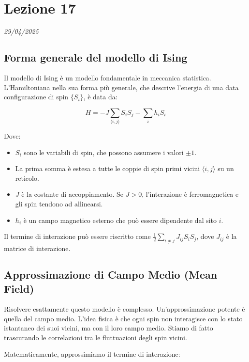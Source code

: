 \chapter{Lezione 17}
\label{capitolo_17}
\textit{29/04/2025}

\section{Forma generale del modello di Ising}
Il modello di Ising è un modello fondamentale in meccanica statistica. L'Hamiltoniana nella sua forma più generale, che descrive l'energia di una data configurazione di spin $\{S_i\}$, è data da:

\begin{equation} \label{eq:ch17_1}
H = -J \sum_{\langle i,j \rangle} S_i S_j - \sum_i h_i S_i
\end{equation}

Dove:
\begin{itemize}
    \item $S_i$ sono le variabili di spin, che possono assumere i valori $\pm 1$.
    \item La prima somma è estesa a tutte le coppie di spin primi vicini $\langle i,j \rangle$ su un reticolo.
    \item $J$ è la costante di accoppiamento. Se $J>0$, l'interazione è ferromagnetica e gli spin tendono ad allinearsi.
    \item $h_i$ è un campo magnetico esterno che può essere dipendente dal sito $i$.
\end{itemize}

Il termine di interazione può essere riscritto come $\frac{1}{2} \sum_{i \neq j} J_{ij} S_i S_j$, dove $J_{ij}$ è la matrice di interazione.

\section{Approssimazione di Campo Medio (Mean Field)}
Risolvere esattamente questo modello è complesso. Un'approssimazione potente è quella del campo medio. L'idea fisica è che ogni spin non interagisce con lo stato istantaneo dei suoi vicini, ma con il loro campo medio. Stiamo di fatto trascurando le correlazioni tra le fluttuazioni degli spin vicini.

Matematicamente, approssimiamo il termine di interazione:

